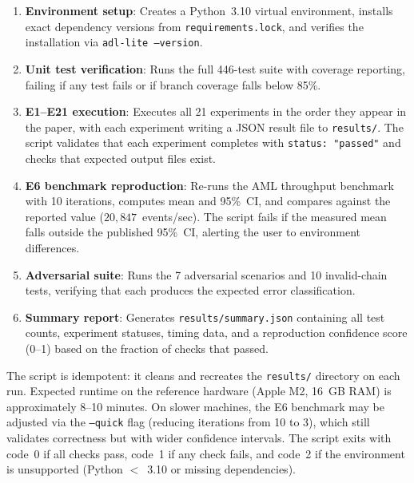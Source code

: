\begin{enumerate}
    \item \textbf{Environment setup}: Creates a Python~3.10 virtual environment, installs exact dependency versions from \texttt{requirements.lock}, and verifies the installation via \texttt{adl-lite --version}.
    \item \textbf{Unit test verification}: Runs the full 446-test suite with coverage reporting, failing if any test fails or if branch coverage falls below 85\%.
    \item \textbf{E1--E21 execution}: Executes all 21 experiments in the order they appear in the paper, with each experiment writing a JSON result file to \texttt{results/}. The script validates that each experiment completes with \texttt{status: "passed"} and checks that expected output files exist.
    \item \textbf{E6 benchmark reproduction}: Re-runs the AML throughput benchmark with 10 iterations, computes mean and 95\%~CI, and compares against the reported value ($20{,}847$~events/sec). The script fails if the measured mean falls outside the published 95\%~CI, alerting the user to environment differences.
    \item \textbf{Adversarial suite}: Runs the 7 adversarial scenarios and 10 invalid-chain tests, verifying that each produces the expected error classification.
    \item \textbf{Summary report}: Generates \texttt{results/summary.json} containing all test counts, experiment statuses, timing data, and a reproduction confidence score (0--1) based on the fraction of checks that passed.
\end{enumerate}

The script is idempotent: it cleans and recreates the \texttt{results/} directory on each run. Expected runtime on the reference hardware (Apple M2, 16~GB RAM) is approximately 8--10 minutes. On slower machines, the E6 benchmark may be adjusted via the \texttt{--quick} flag (reducing iterations from 10 to 3), which still validates correctness but with wider confidence intervals. The script exits with code~0 if all checks pass, code~1 if any check fails, and code~2 if the environment is unsupported (Python $<$~3.10 or missing dependencies).
